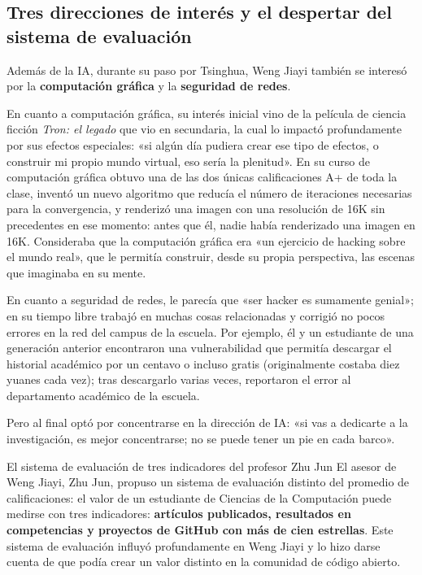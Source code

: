 \documentclass[a4paper]{article}
\begin{document}
\subsection{Tres direcciones de interés y el despertar del sistema de evaluación}

Además de la IA, durante su paso por Tsinghua, Weng Jiayi también se interesó por la \textbf{computación gráfica} y la \textbf{seguridad de redes}.

En cuanto a computación gráfica, su interés inicial vino de la película de ciencia ficción \textit{Tron: el legado} que vio en secundaria, la cual lo impactó profundamente por sus efectos especiales: «si algún día pudiera crear ese tipo de efectos, o construir mi propio mundo virtual, eso sería la plenitud». En su curso de computación gráfica obtuvo una de las dos únicas calificaciones A+ de toda la clase, inventó un nuevo algoritmo que reducía el número de iteraciones necesarias para la convergencia, y renderizó una imagen con una resolución de 16K sin precedentes en ese momento: antes que él, nadie había renderizado una imagen en 16K. Consideraba que la computación gráfica era «un ejercicio de hacking sobre el mundo real», que le permitía construir, desde su propia perspectiva, las escenas que imaginaba en su mente.

En cuanto a seguridad de redes, le parecía que «ser hacker es sumamente genial»; en su tiempo libre trabajó en muchas cosas relacionadas y corrigió no pocos errores en la red del campus de la escuela. Por ejemplo, él y un estudiante de una generación anterior encontraron una vulnerabilidad que permitía descargar el historial académico por un centavo o incluso gratis (originalmente costaba diez yuanes cada vez); tras descargarlo varias veces, reportaron el error al departamento académico de la escuela.

Pero al final optó por concentrarse en la dirección de IA: «si vas a dedicarte a la investigación, es mejor concentrarse; no se puede tener un pie en cada barco».

\begin{knowledgebox}{El sistema de evaluación de tres indicadores del profesor Zhu Jun}
El asesor de Weng Jiayi, Zhu Jun, propuso un sistema de evaluación distinto del promedio de calificaciones: el valor de un estudiante de Ciencias de la Computación puede medirse con tres indicadores: \textbf{artículos publicados, resultados en competencias y proyectos de GitHub con más de cien estrellas}. Este sistema de evaluación influyó profundamente en Weng Jiayi y lo hizo darse cuenta de que podía crear un valor distinto en la comunidad de código abierto.
\end{knowledgebox}
\end{document}
